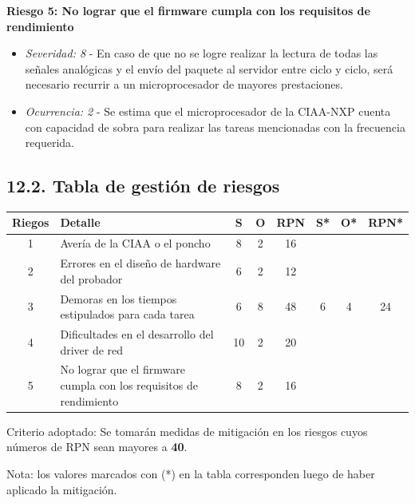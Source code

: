 \documentclass[11pt]{charter}
\begin{document}
\begin{tcolorbox}
\textbf{Riesgo 5: No lograr que el firmware cumpla con los requisitos de rendimiento}
\begin{itemize}
	\item \textit{Severidad: 8} - En caso de que no se logre realizar la lectura de todas las señales analógicas y el envío del paquete al servidor entre ciclo y ciclo, será necesario recurrir a un microprocesador de mayores prestaciones.
	\item \textit{Ocurrencia: 2} - Se estima que el microprocesador de la CIAA-NXP cuenta con capacidad de sobra para realizar las tareas mencionadas con la frecuencia requerida.
\end{itemize}
\end{tcolorbox}

\subsection*{12.2. Tabla de gestión de riesgos}

\begin{table}[htpb]
\centering
\begin{tabularx}{\linewidth}{@{}|c|X|c|c|c|c|c|c|@{}}
\hline
\rowcolor[HTML]{C0C0C0} 
Riegos & Detalle                                                            & S  & O & RPN & S* & O* & RPN* \\ \hline
1      & Avería de la CIAA o el poncho                                      & 8  & 2 & 16  &    &    &      \\ \hline
2      & Errores en el diseño de hardware del probador                      & 6  & 2 & 12  &    &    &      \\ \hline
3      & Demoras en los tiempos estipulados para cada tarea                 & 6  & 8 & 48  & 6  & 4  & 24   \\ \hline
4      & Dificultades en el desarrollo del driver de red                    & 10 & 2 & 20  &    &    &      \\ \hline
5      & No lograr que el firmware cumpla con los requisitos de rendimiento & 8  & 2 & 16  &    &    &      \\ \hline
\end{tabularx}%
\end{table}

Criterio adoptado: 
Se tomarán medidas de mitigación en los riesgos cuyos números de RPN sean mayores a \textbf{40}.

Nota: los valores marcados con (*) en la tabla corresponden luego de haber aplicado la mitigación.
\end{document}

